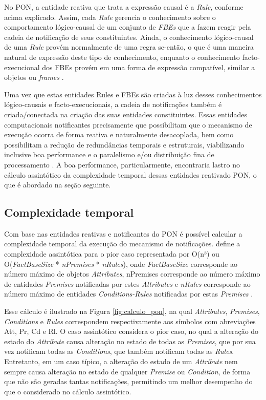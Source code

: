 No PON, a entidade reativa que trata a expressão causal é a \textit{Rule},
conforme acima explicado. Assim, cada \textit{Rule} gerencia o conhecimento
sobre o comportamento lógico-causal de um conjunto de \textit{FBEs} que a fazem
reagir pela cadeia de notificação de seus constituintes. Ainda, o conhecimento
lógico-causal de uma \textit{Rule} provém normalmente de uma regra se-então, o
que é uma maneira natural de expressão deste tipo de conhecimento, enquanto o
conhecimento facto-execucional dos FBEs provém em uma forma de expressão
compatível, similar a objetos ou \textit{frames} \cite{doc_ronszcka_2019}.

Uma vez que estas entidades Rules e FBEs são criadas à luz desses conhecimentos
lógico-causais e facto-execucionais, a cadeia de notificações também é
criada/conectada na criação das suas entidades constituintes. Essas entidades
computacionais notificantes precisamente que possibilitam que o mecanismo de
execução ocorra de forma reativa e naturalmente desacoplada, bem como
possibilitam a redução de redundâncias temporais e estruturais, viabilizando
inclusive boa performance e o paralelismo e/ou distribuição fina de
processamento \cite{simao_2012a}. A boa performance, particularmente,
encontraria lastro no cálculo assintótico da complexidade temporal dessas
entidades reativado PON, o que é abordado na seção seguinte.

\subsection{Complexidade temporal}\label{sec:complexidade}

Com base nas entidades reativas e notificantes do PON é possível calcular a
complexidade temporal da execução do mecanismo de notificações.
 define a complexidade assintótica para o pior
caso representada por O(n³) ou O(\textit{FactBaseSize} * \textit{nPremises} *
\textit{nRules}), onde \textit{FactBaseSize} corresponde ao número máximo de
objetos \textit{Attributes}, nPremises corresponde ao número máximo de entidades
\textit{Premises} notificadas por estes \textit{Attributes} e \textit{nRules}
corresponde ao número máximo de entidades \textit{Conditions-Rules} notificadas
por estas \textit{Premises} \cite{doc_simao_2005,msc_Banaszewski_2009}.

Esse cálculo é ilustrado na Figura \ref{fig:calculo_pon}, na qual
\textit{Attributes}, \textit{Premises}, \textit{Conditions} e \textit{Rules}
correspondem respectivamente aos símbolos com abreviações Att, Pr, Cd e Rl.
O caso assintótico considera o pior caso, no qual a alteração do estado do
\textit{Attribute} causa alteração no estado de todas as \textit{Premises}, que
por sua vez notificam todas as \textit{Conditions}, que também notificam todas
as \textit{Rules}. Entretanto, em um caso típico, a alteração do estado de um
\textit{Attribute} nem sempre causa alteração no estado de qualquer
\textit{Premise} ou \textit{Condition}, de forma que não são geradas tantas
notificações, permitindo um melhor desempenho do que o considerado no cálculo
assintótico.

